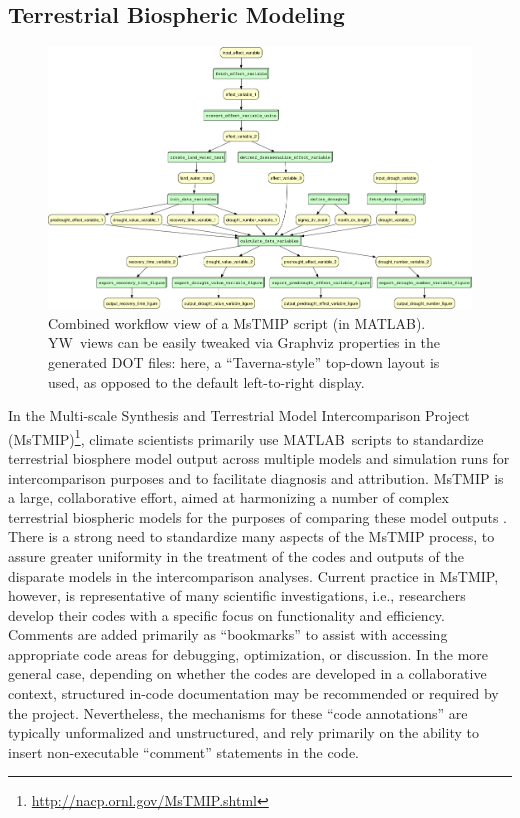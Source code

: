 \documentclass[15]{ijdc-v9}
\newcommand{\yw}{\textsf{YW}}
\newcommand{\MATLAB}{MATLAB}
\begin{document}
\subsection{Terrestrial Biospheric Modeling}\label{sec-MsTMIP}

  \begin{figure}[t]
   \centering
   \includegraphics[width=.99\textwidth]{figures/MsTMIP_combined-crop.pdf}
   \caption{Combined workflow view of a MsTMIP script (in
     \MATLAB). \yw\ views can be easily tweaked via Graphviz
     properties in the generated DOT files: here, a ``Taverna-style''
     \protect\cite{oinn2004taverna}
     top-down layout is used, as opposed to the default left-to-right
     display.}
   \label{fig-mstmip}
 \end{figure}


In the Multi-scale Synthesis and Terrestrial Model Intercomparison
Project (MsTMIP)\footnote{\url{http://nacp.ornl.gov/MsTMIP.shtml}},
climate scientists primarily use \MATLAB\ scripts to standardize
terrestrial biosphere model output across multiple models and
simulation runs for intercomparison purposes and to facilitate
diagnosis and attribution.
MsTMIP is a large, collaborative effort, aimed at harmonizing a number
of complex terrestrial biospheric models for the purposes of comparing
these model outputs \cite{huntzinger2013north}. There is a strong need
to standardize many aspects of the MsTMIP process, to assure greater
uniformity in the treatment of the codes and outputs of the disparate
models in the intercomparison analyses. Current practice in MsTMIP,
however, is representative of many scientific investigations, i.e.,
researchers develop their codes with a specific focus on functionality
and efficiency. Comments are added primarily as ``bookmarks'' to
assist with accessing appropriate code areas for debugging,
optimization, or discussion. In the more general case, depending on
whether the codes are developed in a collaborative context, structured
in-code documentation may be recommended or required by the
project. Nevertheless,  the mechanisms for these ``code annotations'' are
typically unformalized and unstructured, and rely primarily on the
ability to insert non-executable ``comment'' statements in the code.
\end{document}
